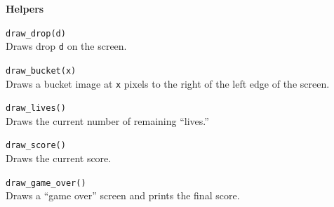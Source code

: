 \documentclass[10pt,twocolumn]{article}
\begin{document}
\bigskip

\noindent\textbf{\large Helpers}
\begin{description}

\item{\texttt{draw\_drop(d)}}\ \\[.25em] 
%
Draws drop \texttt{d} on the screen. 

\item{\texttt{draw\_bucket(x)}}\ \\[.25em] 
% 
Draws a bucket image at \texttt{x} pixels to the right of the left
edge of the screen.

\item{\texttt{draw\_lives()}}\ \\[.25em] 
% 
Draws the current number of remaining ``lives.''

\item{\texttt{draw\_score()}}\ \\[.25em] 
% 
Draws the current score.

\item{\texttt{draw\_game\_over()}}\ \\[.25em] 
%
Draws a ``game over'' screen and prints the final score. 

\end{description}
\end{document}
